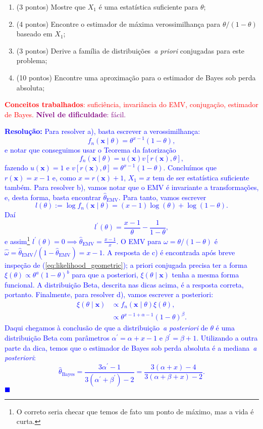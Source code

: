 \documentclass[a4paper,10pt, notitlepage]{report}
\newcommand{\bx}{\boldsymbol{x}} %
\newcommand{\emv}{\hat{\theta}_{\text{EMV}}}
\begin{document}
\begin{enumerate}[label=\alph*)]
 \item (3 pontos)  Mostre que $X_1$ é uma estatística suficiente para $\theta$;
 \item (4 pontos) Encontre o estimador de máxima verossimilhança para $\theta/(1-\theta)$ baseado em $X_1$;
 \item (3 pontos) Derive a família de distribuições~\textit{a priori} conjugadas para este problema;
 \item (10 pontos) Encontre uma aproximação para o estimador de Bayes sob perda absoluta;
\end{enumerate}

\textcolor{red}{\textbf{Conceitos trabalhados}: suficiência, invariância do EMV, conjugação, estimador de Bayes.}
\textcolor{purple}{\textbf{Nível de dificuldade}: fácil.}

\textcolor{blue}{
\textbf{Resolução:}
Para resolver a), basta escrever a verossimilhança:
\begin{equation}
 \label{eq:likelihood_geometric}
 f_n(\bx \mid \theta) = \theta^{x-1}(1-\theta),
\end{equation}
e notar que conseguimos usar o Teorema da fatorização
\[ f_n(\bx \mid \theta) = u(\bx) v[r(\bx), \theta], \]
fazendo $u(\bx) = 1$ e $v[r(\bx), \theta] = \theta^{x-1}(1-\theta)$.
Concluímos que $r(\bx) = x-1$ e, como $x = r(\bx) + 1$, $X_1 = x$ tem de ser estatística suficiente também.
Para resolver b), vamos notar que o EMV é invariante a transformações, e, desta forma, basta encontrar $\emv$.
Para tanto, vamos escrever
\[l(\theta) := \log f_n(\bx \mid \theta) = (x-1)\log(\theta) + \log(1-\theta).\]
Daí
\begin{equation*}
 l^\prime(\theta) = \frac{x-1}{\theta} - \frac{1}{1-\theta},
\end{equation*}
e assim\footnote{O correto seria checar que temos de fato um ponto de máximo, mas a vida é curta.} $l^\prime(\theta) = 0 \implies \emv = \frac{x-1}{x}$. 
O EMV para $\omega = \theta/(1-\theta)$ é $\hat{\omega} = \emv/(1-\emv) = x-1$.
A resposta de c) é encontrada após breve inspeção de (\ref{eq:likelihood_geometric}); a priori conjugada precisa ter a forma $\xi(\theta) \propto \theta^{a}(1-\theta)^b$ para que a posteriori, $\xi(\theta \mid \bx)$ tenha a mesma forma funcional.
A distribuição Beta, descrita nas dicas acima, é a resposta correta, portanto.
Finalmente, para resolver d), vamos escrever a posteriori:
\begin{align*}
 \xi(\theta \mid \bx) &\propto f_n(\bx \mid \theta)\xi(\theta),\\
 &\propto \theta^{x-1 + \alpha - 1}(1-\theta)^{\beta}.
\end{align*}
Daqui chegamos à conclusão de que a distribuição~\textit{a posteriori} de $\theta$ é uma distribuição Beta com parâmetros $\alpha^\prime = \alpha + x - 1$ e $\beta^\prime = \beta + 1$.
Utilizando a outra parte da dica, temos que o estimador de Bayes sob perda absoluta é a mediana~\textit{a posteriori}:
\begin{equation}
 \hat{\theta}_{\text{Bayes}} = \frac{3\alpha^\prime -1}{3(\alpha^\prime + \beta^\prime) -2} = \frac{3(\alpha + x) - 4}{3(\alpha + \beta + x) - 2}. 
\end{equation}
$\blacksquare$
}
\end{document}
